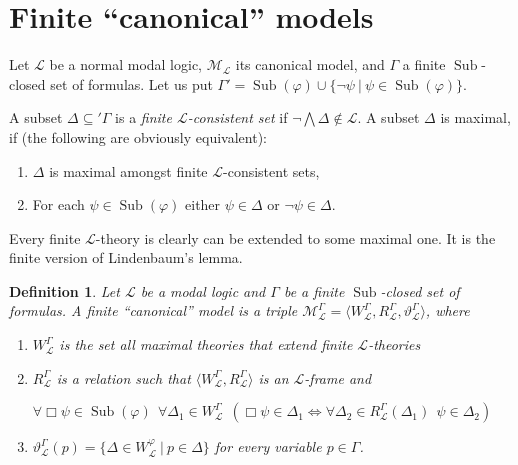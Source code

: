 \documentclass[a4paper]{article}
\theoremstyle{defin}
\newtheorem{defin}{Definition}
\theoremstyle{theorem}
\theoremstyle{prop}
\theoremstyle{lemma}
\theoremstyle{fact}
\theoremstyle{ex}
\theoremstyle{col}
\begin{document}
\section{Finite ``canonical'' models}

Let $\mathcal{L}$ be a normal modal logic, $\mathcal{M}_{\mathcal{L}}$ its canonical model, and $\Gamma$ a finite $\operatorname{Sub}$-closed set of formulas. Let us put $\Gamma' = \operatorname{Sub}(\varphi) \cup \{ \neg \psi \: | \: \psi \in \operatorname{Sub}(\varphi) \}$.

A subset $\Delta \subseteq '\Gamma$ is a \emph{finite $\mathcal{L}$-consistent set} if $\neg \bigwedge \Delta \notin \mathcal{L}$. A subset $\Delta$ is maximal, if (the following are obviously equivalent):
\begin{enumerate}
  \item $\Delta$ is maximal amongst finite $\mathcal{L}$-consistent sets,
  \item For each $\psi \in \operatorname{Sub}(\varphi)$ either $\psi \in \Delta$ or
  $\neg \psi \in \Delta$.
\end{enumerate}

Every finite $\mathcal{L}$-theory is clearly can be extended to some maximal one. It is the finite version of Lindenbaum's lemma.

\begin{defin}\label{fin}
  Let $\mathcal{L}$ be a modal logic and $\Gamma$ be a finite $\operatorname{Sub}$-closed set of formulas. A finite ``canonical'' model is a triple $\mathcal{M}_{\mathcal{L}}^{\Gamma} = \langle W_{\mathcal{L}}^{\Gamma}, R_{\mathcal{L}}^{\Gamma}, \vartheta_{\mathcal{L}}^{\Gamma} \rangle$, where
  \begin{enumerate}
    \item $W_{\mathcal{L}}^{\Gamma}$ is the set all maximal theories that extend finite $\mathcal{L}$-theories
    \item $R_{\mathcal{L}}^{\Gamma}$ is a relation such that
    $\langle W_{\mathcal{L}}^{\Gamma}, R_{\mathcal{L}}^{\Gamma} \rangle$ is an $\mathcal{L}$-frame
    and
    \begin{center}
    $\forall \Box \psi \in \operatorname{Sub}(\varphi) \:\:
    \forall \Delta_1 \in W_{\mathcal{L}}^{\Gamma} \:\: (\Box \psi \in \Delta_1 \Leftrightarrow
    \forall \Delta_2 \in R_{\mathcal{L}}^{\Gamma}(\Delta_1) \:\: \psi \in \Delta_2)$
    \end{center}
    \item $\vartheta_{\mathcal{L}}^{\Gamma}(p) = \{ \Delta \in W_{\mathcal{L}}^{\varphi} \: | \: p \in \Delta \}$ for every variable $p \in \Gamma$.
  \end{enumerate}
\end{defin}
\end{document}
